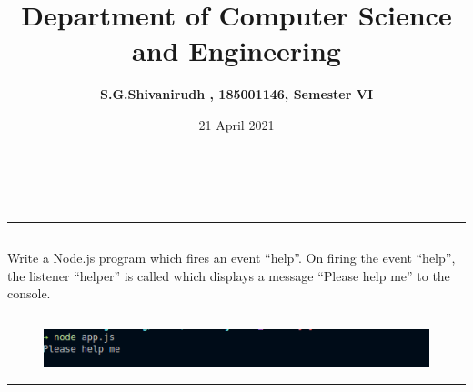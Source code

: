 \documentclass[12pt,letterpaper]{article}
\title{\textbf{Department of Computer Science and Engineering}}
\author{\textbf{S.G.Shivanirudh , 185001146, Semester VI }}
\date{21 April 2021}
\begin{document}
\maketitle
\hrule
\section*{}
\hrule 
\bigskip\bigskip

\subsection*{}

\subsection*{}
\begin{flushleft}
    Write a Node.js program which fires an event “help”. On firing the event “help”, the listener “helper” 
    is called which displays a message “Please help me” to the console.
\end{flushleft}

\subsection*{}

\subsubsection*{}
\begin{flushleft}

\end{flushleft}

\subsection*{}
\begin{figure}[h]
    \centering
    \includegraphics[width = \textwidth]{Pics/op.png}
\end{figure}

\hrule
\end{document}
